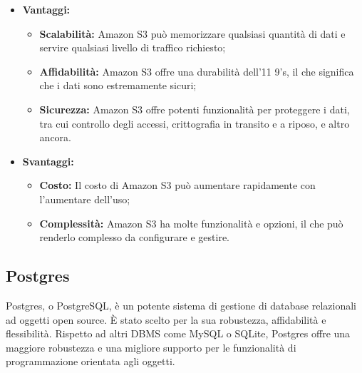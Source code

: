 \documentclass[10pt, a4paper]{article}
\begin{document}
\begin{itemize}
\item \textbf{Vantaggi:}
\begin{itemize}
\item \textbf{Scalabilità:} Amazon S3 può memorizzare qualsiasi quantità di dati e servire qualsiasi livello di traffico richiesto;
\item \textbf{Affidabilità:} Amazon S3 offre una durabilità dell'11 9's, il che significa che i dati sono estremamente sicuri;
\item \textbf{Sicurezza:} Amazon S3 offre potenti funzionalità per proteggere i dati, tra cui controllo degli accessi, crittografia in transito e a riposo, e altro ancora.
\end{itemize}
\item \textbf{Svantaggi:}
\begin{itemize}
\item \textbf{Costo:} Il costo di Amazon S3 può aumentare rapidamente con l'aumentare dell'uso;
\item \textbf{Complessità:} Amazon S3 ha molte funzionalità e opzioni, il che può renderlo complesso da configurare e gestire.
\end{itemize}
\end{itemize}

\subsection{Postgres}
Postgres, o PostgreSQL, è un potente sistema di gestione di database relazionali ad oggetti open source. È stato scelto per la sua robustezza, affidabilità e flessibilità. Rispetto ad altri DBMS come MySQL o SQLite, Postgres offre una maggiore robustezza e una migliore supporto per le funzionalità di programmazione orientata agli oggetti.
\end{document}
